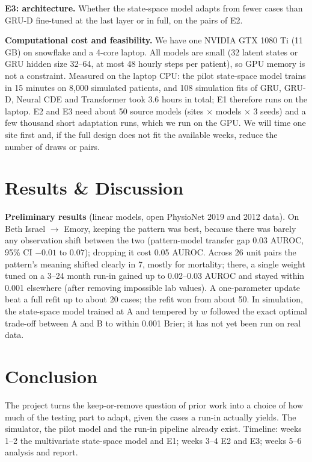 \documentclass{article}
\theoremstyle{plain}
\theoremstyle{definition}
\theoremstyle{remark}
\begin{document}
\textbf{E3: architecture.} Whether the state-space model adapts from fewer cases than GRU-D fine-tuned at the last layer or in full, on the pairs of E2.

\textbf{Computational cost and feasibility.} We have one NVIDIA GTX 1080 Ti (11\,GB) on snowflake and a 4-core laptop. All models are small (32 latent states or GRU hidden size 32--64, at most 48 hourly steps per patient), so GPU memory is not a constraint. Measured on the laptop CPU: the pilot state-space model trains in 15 minutes on 8{,}000 simulated patients, and 108 simulation fits of GRU, GRU-D, Neural CDE and Transformer took 3.6 hours in total; E1 therefore runs on the laptop. E2 and E3 need about 50 source models (sites $\times$ models $\times$ 3 seeds) and a few thousand short adaptation runs, which we run on the GPU. We will time one site first and, if the full design does not fit the available weeks, reduce the number of draws or pairs.

\section{Results \& Discussion}

\textbf{Preliminary results} (linear models, open PhysioNet 2019 and 2012 data). On Beth Israel $\to$ Emory, keeping the pattern was best, because there was barely any observation shift between the two (pattern-model transfer gap 0.03 AUROC, 95\% CI $-0.01$ to $0.07$); dropping it cost 0.05 AUROC. Across 26 unit pairs the pattern's meaning shifted clearly in 7, mostly for mortality; there, a single weight tuned on a 3--24 month run-in gained up to 0.02--0.03 AUROC and stayed within 0.001 elsewhere (after removing impossible lab values). A one-parameter update beat a full refit up to about 20 cases; the refit won from about 50. In simulation, the state-space model trained at A and tempered by $w$ followed the exact optimal trade-off between A and B to within 0.001 Brier; it has not yet been run on real data.

\section{Conclusion}

The project turns the keep-or-remove question of prior work into a choice of how much of the testing part to adapt, given the cases a run-in actually yields. The simulator, the pilot model and the run-in pipeline already exist. Timeline: weeks 1--2 the multivariate state-space model and E1; weeks 3--4 E2 and E3; weeks 5--6 analysis and report.




\end{document}
